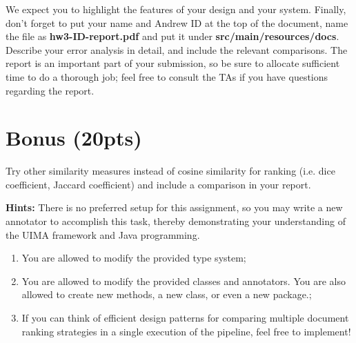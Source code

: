 \documentclass[oneside,11pt]{book}
\begin{document}
We expect you to highlight the features of your design and your system. 
Finally, don’t forget to put
your name and Andrew ID at the top of the document, 
name the file as \textbf{hw3-ID-report.pdf} and put it
under \textbf{src/main/resources/docs}. 
Describe your error analysis in detail, and include the relevant
comparisons. The report is an important part of your submission, so be sure to allocate sufficient time
to do a thorough job; feel free to consult the TAs if you have questions regarding the report.

\chapter*{Bonus (20pts)}

Try other similarity measures instead of cosine similarity for ranking (i.e. dice coefficient, Jaccard
coefficient) and include a comparison in your report.


\textbf{Hints:} There is no preferred setup for this assignment, so you may write a new annotator to accomplish this
task, thereby demonstrating your understanding of the UIMA framework and Java programming.

\begin{enumerate}
\item You are allowed to modify the provided type system;
\item You are allowed to modify the provided classes and annotators. You are also allowed to create new
methods, a new class, or even a new package.;
\item If you can think of efficient design patterns for comparing multiple document ranking strategies in a
single execution of the pipeline, feel free to implement!
\end{enumerate}
\end{document}

